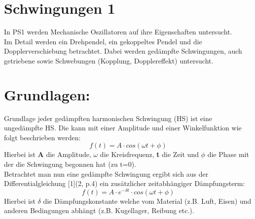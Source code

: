 \documentclass[12pt,a4paper]{article}
\begin{document}
\begin{multicols}{2}




%			




\section{Schwingungen 1}
In PS1 werden Mechanische Oszillatoren auf ihre Eigenschaften untersucht.\\
Im Detail werden ein Drehpendel, ein gekoppeltes Pendel und die Dopplerverschiebung betrachtet. Dabei werden gedämpfte Schwingungen, auch getriebene sowie Schwebungen (Kopplung, Dopplereffekt) untersucht.
\section{Grundlagen:}
Grundlage jeder gedämpften harmonischen Schwingung (HS) ist eine ungedämpfte HS. Die kann mit einer Amplitude und einer Winkelfunktion wie folgt beschrieben werden:
$$f(t) = A \cdot cos(\omega t + \phi)$$
Hierbei ist \textbf{A} die Amplitude, \textbf{$\omega$} die Kreisfrequenz, \textbf{t} die Zeit und \textbf{$\phi$} die Phase mit der die Schwingung begonnen hat (zu t=0).\\
Betrachtet man nun eine gedämpfte Schwingung ergibt sich aus der Differentialgleichung [1](2, p.4) ein zusätzlicher zeitabhängiger Dämpfungsterm: 
$$f(t) = A \cdot e^{- \delta t} \cdot cos(\omega t + \phi)$$ 
Hierbei ist $\delta$ die Dämpfungskonstante welche vom Material (z.B. Luft, Eisen) und anderen Bedingungen abhängt (z.B. Kugellager, Reibung etc.).\\


\end{multicols}
\end{document}
